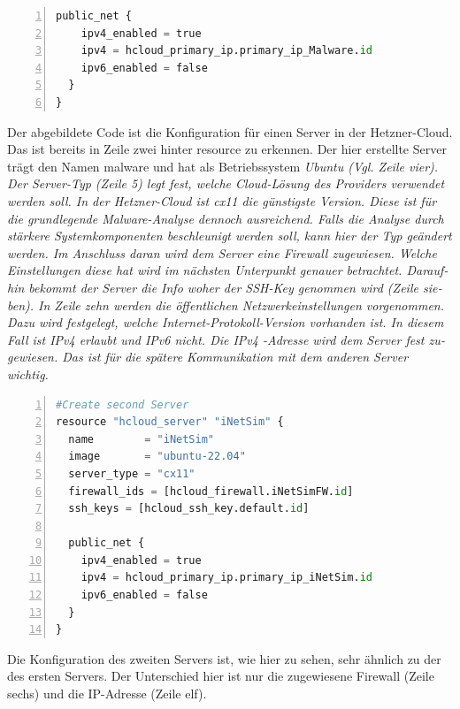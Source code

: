 \begin{otherlanguage}{ngerman}
\begin{lstlisting}[caption = Konfiguration Malware-Server, language=python, numbers=left, numberstyle=\tiny]
public_net {
    ipv4_enabled = true
    ipv4 = hcloud_primary_ip.primary_ip_Malware.id
    ipv6_enabled = false
  }
}
\end{lstlisting}
\rm
Der abgebildete Code ist die Konfiguration für einen Server in der \dq Hetzner-Cloud\dq. Das ist bereits in Zeile zwei hinter \dq resource \dq{} zu erkennen. Der hier erstellte Server trägt den Namen \dq malware \dq{} und hat als Betriebssystem \it Ubuntu \rm (Vgl. Zeile vier). Der Server-Typ (Zeile 5) legt fest, welche Cloud-Lösung des Providers verwendet werden soll. In der \dq Hetzner-Cloud \dq{} ist \dq cx11\dq{} die günstigste Version. Diese ist für die grundlegende Malware-Analyse dennoch ausreichend. Falls die Analyse durch stärkere Systemkomponenten beschleunigt werden soll, kann hier der Typ geändert werden. 
\newline
Im Anschluss daran wird dem Server eine Firewall zugewiesen. Welche Einstellungen diese hat wird im nächsten Unterpunkt genauer betrachtet. Daraufhin bekommt der Server die Info woher der SSH-Key genommen wird (Zeile sieben). In Zeile zehn werden die öffentlichen Netzwerkeinstellungen vorgenommen. Dazu wird festgelegt, welche \dq Internet-Protokoll-Version \dq{} vorhanden ist. In diesem Fall ist \dq IPv4 \dq{} erlaubt und \dq IPv6 \dq{} nicht. Die \dq IPv4 \dq-Adresse wird dem Server fest zugewiesen. Das ist für die spätere Kommunikation mit dem anderen Server wichtig.
\newline
\newline
\tt  
\begin{lstlisting}[caption = Konfiguration iNetSim-Server, language=python, numbers=left, numberstyle=\tiny]
#Create second Server
resource "hcloud_server" "iNetSim" {
  name        = "iNetSim"
  image       = "ubuntu-22.04"
  server_type = "cx11"
  firewall_ids = [hcloud_firewall.iNetSimFW.id]
  ssh_keys = [hcloud_ssh_key.default.id]
  
  public_net {
    ipv4_enabled = true
    ipv4 = hcloud_primary_ip.primary_ip_iNetSim.id
    ipv6_enabled = false
  }
}
\end{lstlisting}
\rm
Die Konfiguration des zweiten Servers ist, wie hier zu sehen, sehr ähnlich zu der des ersten Servers. Der Unterschied hier ist nur die zugewiesene Firewall (Zeile sechs) und die IP-Adresse (Zeile elf). 

\end{otherlanguage}

